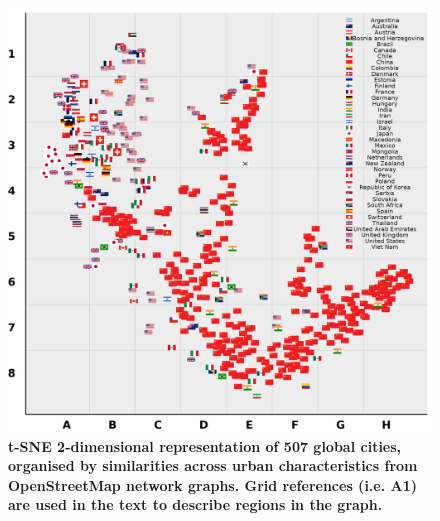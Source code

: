 \documentclass[preprint,10pt]{elsarticle} %
\begin{document}
\begin{figure}
\centering
\includegraphics[trim={ 0 0 0 0 },clip,scale=1.0]{Images/ByCountry_latlong_flags_all.png}%
\caption{\bf t-SNE 2-dimensional representation of 507 global cities, organised by similarities across urban characteristics from OpenStreetMap network graphs. Grid references (i.e. A1) are used in the text to describe regions in the graph.}
 \label{fig:tSNE}
\end{figure}
\end{document}
